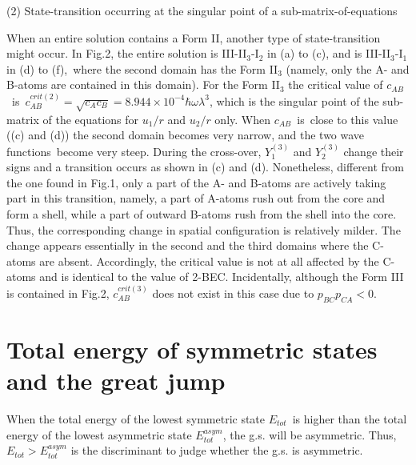 \documentclass[single-column,showpacs,groupedaddress]{revtex4}
\begin{document}
(2) State-transition occurring at the singular point of a
sub-matrix-of-equations

When an entire solution contains a Form II, another type of state-transition
might occur. In Fig.2, the entire solution is III-II$_{3}$-I$_{2}$ in (a) to
(c), and is III-II$_{3}$-I$_{1}$ in (d) to (f),\ where the second domain has
the Form II$_{3}$ (namely, only the A- and B-atoms are contained in this
domain). For the Form II$_{3}$ the critical value of $c_{AB}$\ is\ $%
c_{AB}^{crit(2)}=\sqrt{c_{A}c_{B}}=8.944\times 10^{-4}\hbar \omega \lambda
^{3}$, which is the singular point of the sub-matrix of the equations for $%
u_{1}/r$ and $u_{2}/r$ only. When $c_{AB}$\ is\ close to this value ((c) and
(d)) the second domain becomes very narrow, and the two wave functions\
become very steep. During the cross-over, $Y_{1}^{(3)}$ and $Y_{2}^{(3)}$
change their signs and a transition occurs as shown in (c) and (d).
Nonetheless, different from the one found in Fig.1, only a part of the A-
and B-atoms are actively taking part in this transition, namely, a part of
A-atoms rush out from the core and form a shell, while a part of outward
B-atoms rush from the shell into the core. Thus, the corresponding change in
spatial configuration is relatively milder. The change appears essentially
in the second and the third domains where the C-atoms are absent.
Accordingly, the critical value is not at all affected by the C-atoms and is
identical to the value of 2-BEC. Incidentally, although the Form III is
contained in Fig.2, $c_{AB}^{crit(3)}$ does not exist in this case due to $%
p_{BC}p_{CA}<0$.

\section*{Total energy of symmetric states and the great jump}

When the total energy of the lowest symmetric state $E_{tot}$\ is higher
than the total energy of the lowest asymmetric state $E_{tot}^{asym}$, the
g.s. will be asymmetric. Thus, $E_{tot}>E_{tot}^{asym}$ is the discriminant
to judge whether the g.s. is asymmetric.
\end{document}
